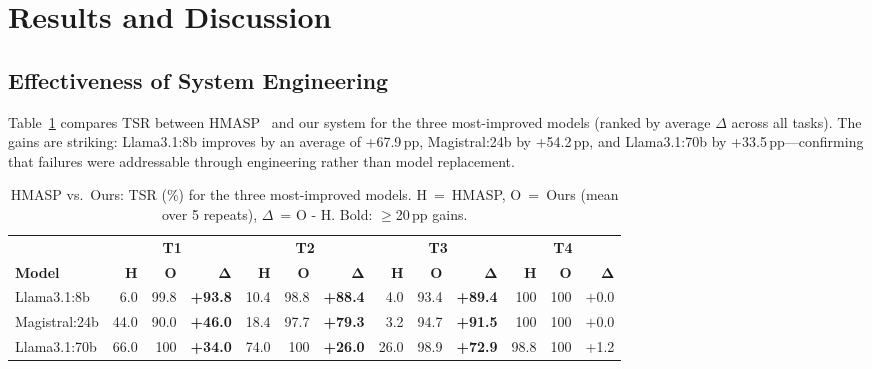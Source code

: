 \documentclass[runningheads]{llncs}
\begin{document}
\section{Results and Discussion}

\subsection{Effectiveness of System Engineering}

Table~\ref{tab:paper_vs_latest} compares TSR between HMASP~\cite{chua2025hmasp} and our system for the three most-improved models (ranked by average $\Delta$ across all tasks). The gains are striking: Llama3.1:8b improves by an average of +67.9\,pp, Magistral:24b by +54.2\,pp, and Llama3.1:70b by +33.5\,pp---confirming that failures were addressable through engineering rather than model replacement. %

\begin{table}[!ht]
    \centering
    \caption{HMASP vs.\ Ours: TSR (\%) for the three most-improved models. H~=~HMASP, O~=~Ours (mean over 5 repeats), $\Delta$~= O - H. Bold: $\geq$20\,pp gains.}
    \label{tab:paper_vs_latest}
    \renewcommand{\arraystretch}{0.85}
    \setlength{\tabcolsep}{1.5mm}
    \scriptsize
    \begin{tabular}{l rr@{\;}r rr@{\;}r rr@{\;}r rr@{\;}r}
        \toprule
        & \multicolumn{3}{c}{\textbf{T1}} & \multicolumn{3}{c}{\textbf{T2}} & \multicolumn{3}{c}{\textbf{T3}} & \multicolumn{3}{c}{\textbf{T4}} \\
        \cmidrule(lr){2-4} \cmidrule(lr){5-7} \cmidrule(lr){8-10} \cmidrule(lr){11-13}
        \textbf{Model} & \textbf{H} & \textbf{O} & $\boldsymbol{\Delta}$ & \textbf{H} & \textbf{O} & $\boldsymbol{\Delta}$ & \textbf{H} & \textbf{O} & $\boldsymbol{\Delta}$ & \textbf{H} & \textbf{O} & $\boldsymbol{\Delta}$ \\
        \midrule
        Llama3.1:8b & 6.0 & 99.8 & \textbf{\scriptsize+93.8} & 10.4 & 98.8 & \textbf{\scriptsize+88.4} & 4.0 & 93.4 & \textbf{\scriptsize+89.4} & 100 & 100 & \scriptsize$+$0.0 \\
        Magistral:24b & 44.0 & 90.0 & \textbf{\scriptsize+46.0} & 18.4 & 97.7 & \textbf{\scriptsize+79.3} & 3.2 & 94.7 & \textbf{\scriptsize+91.5} & 100 & 100 & \scriptsize$+$0.0 \\
        Llama3.1:70b & 66.0 & 100 & \textbf{\scriptsize+34.0} & 74.0 & 100 & \textbf{\scriptsize+26.0} & 26.0 & 98.9 & \textbf{\scriptsize+72.9} & 98.8 & 100 & \scriptsize+1.2 \\
        \bottomrule
    \end{tabular}
\end{table}
\end{document}

